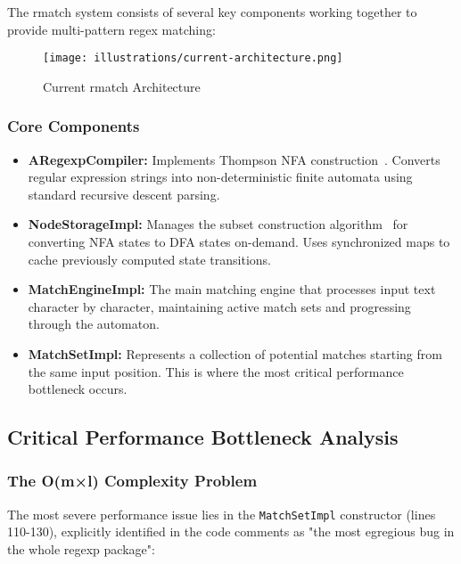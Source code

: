 \documentclass[11pt,a4paper]{article}
\begin{document}
The rmatch system consists of several key components working together to provide multi-pattern regex matching:

\begin{figure}[htbp]
\centering
\texttt{[image: illustrations/current-architecture.png]}
\caption{Current rmatch Architecture}
\label{fig:current-arch}
\end{figure}

\subsubsection{Core Components}

\begin{itemize}

\item \textbf{ARegexpCompiler:} Implements Thompson NFA construction~\cite{thompson1968programming}. Converts regular expression strings into non-deterministic finite automata using standard recursive descent parsing.

\item \textbf{NodeStorageImpl:} Manages the subset construction algorithm~\cite{hopcroft2001introduction} for converting NFA states to DFA states on-demand. Uses synchronized maps to cache previously computed state transitions.

\item \textbf{MatchEngineImpl:} The main matching engine that processes input text character by character, maintaining active match sets and progressing through the automaton.

\item \textbf{MatchSetImpl:} Represents a collection of potential matches starting from the same input position. This is where the most critical performance bottleneck occurs.


\end{itemize}
  
\subsection{Critical Performance Bottleneck Analysis}

\subsubsection{The O(m×l) Complexity Problem}

The most severe performance issue lies in the \texttt{MatchSetImpl} constructor (lines 110-130), explicitly identified in the code comments as "the most egregious bug in the whole regexp package":
\end{document}
